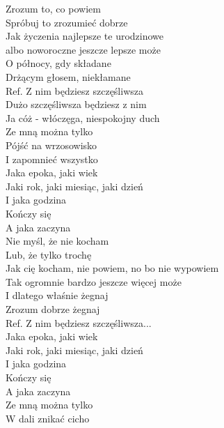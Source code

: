 
Zrozum to, co powiem  \tab{} \\
Spróbuj to zrozumieć dobrze  \tab{}\\
Jak życzenia najlepsze te urodzinowe  \\
albo noworoczne jeszcze lepsze może  \\
O północy, gdy składane \tab{} \\
Drżącym głosem, niekłamane \tab{} \\
\hops
Ref. Z nim będziesz szczęśliwsza \\
 Dużo szczęśliwsza będziesz z nim \\
 Ja cóż - włóczęga, niespokojny duch  \\
 Ze mną można tylko  \tab{}\\
 Pójść na wrzosowisko  \tab{}\\
 I zapomnieć wszystko  \tab{}\\
 {} Jaka epoka, jaki wiek \\
 {} Jaki rok, jaki miesiąc, jaki dzień  \\
 {} I jaka godzina  \tab{}\\
 {} Kończy się \tab{} \\
 {} A jaka zaczyna \tab{} \\
\hops
Nie myśl, że nie kocham \\
Lub, że tylko trochę \\
Jak cię kocham, nie powiem, no bo nie wypowiem \\
Tak ogromnie bardzo jeszcze więcej może \\
I dlatego właśnie żegnaj \\
Zrozum dobrze żegnaj \\
\hops
Ref. Z nim będziesz szczęśliwsza...\\
\hops
{} {} Jaka epoka, jaki wiek \\
 {} Jaki rok, jaki miesiąc, jaki dzień \\
 {} I jaka godzina \\
 {} Kończy się \\
 {} A jaka zaczyna \\
\hops
{} Ze mną można tylko \\
 W dali znikać cicho
